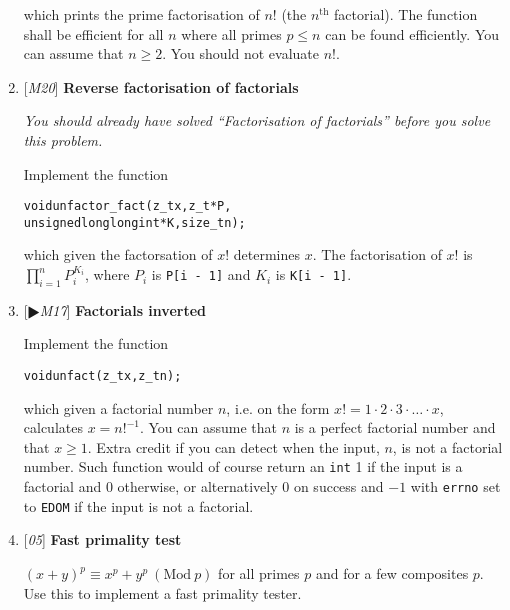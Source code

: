 \begin{enumerate}[label=\textbf{\arabic*}.]
\noindent
which prints the prime factorisation of $n!$
(the $n^{\text{th}}$ factorial). The function shall
be efficient for all $n$ where all primes $p \le n$
can be found efficiently. You can assume that
$n \ge 2$. You should not evaluate $n!$.



\item {[\textit{M20}]} \textbf{Reverse factorisation of factorials}

{\small\textit{You should already have solved
``Factorisation of factorials'' before you solve
this problem.}}

Implement the function

\vspace{-1em}
\begin{alltt}
   void unfactor_fact(z_t x, z_t *P,
        unsigned long long int *K, size_t n);
\end{alltt}
\vspace{-1em}

\noindent
which given the factorsation of $x!$ determines $x$.
The factorisation of $x!$ is
$\displaystyle{\prod_{i = 1}^{n} P_i^{K_i}}$, where
$P_i$ is \texttt{P[i - 1]} and $K_i$ is \texttt{K[i - 1]}.



\item {[$\RHD$\textit{M17}]} \textbf{Factorials inverted}

Implement the function

\vspace{-1em}
\begin{alltt}
   void unfact(z_t x, z_t n);
\end{alltt}
\vspace{-1em}

\noindent
which given a factorial number $n$, i.e. on the form
$x! = 1 \cdot 2 \cdot 3 \cdot \ldots \cdot x$,
calculates $x = n!^{-1}$. You can assume that
$n$ is a perfect factorial number and that $x \ge 1$.
Extra credit if you can detect when the input, $n$,
is not a factorial number. Such function would of
course return an \texttt{int} 1 if the input is a
factorial and 0 otherwise, or alternatively 0
on success and $-1$ with \texttt{errno} set to
\texttt{EDOM} if the input is not a factorial.



\item {[\textit{05}]} \textbf{Fast primality test}

$(x + y)^p \equiv x^p + y^p ~(\text{Mod}~p)$
for all primes $p$ and for a few composites $p$.
Use this to implement a fast primality tester.



\end{enumerate}



